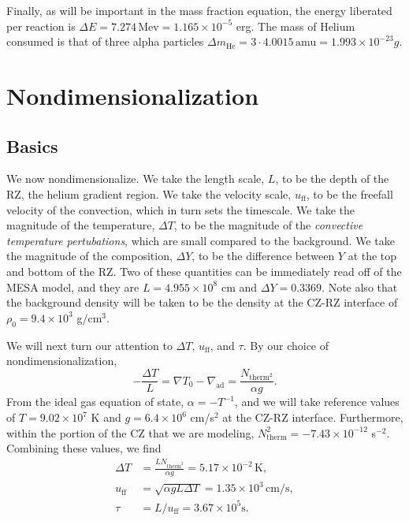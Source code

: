 \documentclass[onecolumn, amsmath, amsfonts, amssymb]{aastex62}
\newcommand{\grad}{\ensuremath{\nabla}}
\renewcommand{\dot}{\ensuremath{\cdot}}
\begin{document}
Finally, as will be important in the mass fraction equation, the energy liberated per reaction is $\Delta E = 7.274\,\mathrm{Mev} = 1.165 \times 10^{-5}$ erg.
The mass of Helium consumed is that of three alpha particles $\Delta m_{\text{He}} = 3\dot4.0015\,\mathrm{amu}  = 1.993 \times 10^{-23} g$.


\section{Nondimensionalization}

\subsection{Basics}
We now nondimensionalize. 
We take the length scale, $L$, to be the depth of the RZ, the helium gradient region.
We take the velocity scale, $u_{\mathrm{ff}}$, to be the freefall velocity of the convection, which in turn sets the timescale.
We take the magnitude of the temperature, $\Delta T$, to be the magnitude of the \emph{convective temperature pertubations}, which are small compared to the background.
We take the magnitude of the composition, $\Delta Y$, to be the difference between $Y$ at the top and bottom of the RZ.
Two of these quantities can be immediately read off of the MESA model, and they are $L = 4.955 \times 10^{8}$ cm and $\Delta Y = 0.3369$.
Note also that the background density will be taken to be the density at the CZ-RZ interface of $\rho_0 = 9.4 \times 10^3$ g/cm$^3$.

We will next turn our attention to $\Delta T$, $u_{\mathrm{ff}}$, and $\tau$.
By our choice of nondimensionalization, 
\begin{equation}
-\frac{\Delta T}{L} = \grad T_0 - \grad_{\mathrm{ad}} = \frac{N_{\mathrm{therm}^2}}{\alpha g}.
\end{equation}
From the ideal gas equation of state, $\alpha = - T^{-1}$, and we will take reference values of $T = 9.02 \times 10^7$ K and $g = 6.4 \times 10^6$ cm/s$^2$ at the CZ-RZ interface.
Furthermore, within the portion of the CZ that we are modeling, $N_{\mathrm{therm}}^2 = -7.43 \times 10^{-12}$ s$^{-2}$.
Combining these values, we find 
\begin{align}
\Delta T &= \frac{L N_{\mathrm{therm}^2}}{\alpha g} = 5.17 \times 10^{-2}\,\mathrm{K},\\
u_{\mathrm{ff}} &= \sqrt{\alpha g L \Delta T} = 1.35 \times 10^{3}\,\mathrm{cm/s},\\
\tau &= L/u_{\mathrm{ff}} = 3.67 \times 10^{5} \mathrm{s}.
\end{align}
\end{document}
